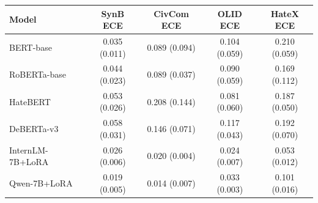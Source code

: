 \begin{tabular}{lcccc}
\toprule
Model & SynB ECE & CivCom ECE & OLID ECE & HateX ECE \\
\midrule
BERT-base & 0.035 (0.011) & 0.089 (0.094) & 0.104 (0.059) & 0.210 (0.059) \\
RoBERTa-base & 0.044 (0.023) & 0.089 (0.037) & 0.090 (0.059) & 0.169 (0.112) \\
HateBERT & 0.053 (0.026) & 0.208 (0.144) & 0.081 (0.060) & 0.187 (0.050) \\
DeBERTa-v3 & 0.058 (0.031) & 0.146 (0.071) & 0.117 (0.043) & 0.192 (0.070) \\
\midrule
InternLM-7B+LoRA & 0.026 (0.006) & 0.020 (0.004) & 0.024 (0.007) & 0.053 (0.012) \\
Qwen-7B+LoRA & 0.019 (0.005) & 0.014 (0.007) & 0.033 (0.003) & 0.101 (0.016) \\
\bottomrule
\end{tabular}
